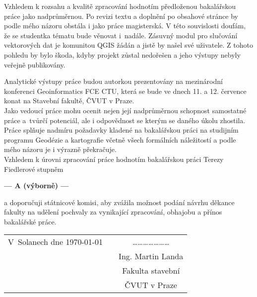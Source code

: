 \documentclass[czech,11pt,a4paper]{article}
\begin{document}
Vzhledem k rozsahu a kvalitě zpracování hodnotím předloženou
bakalářskou práce jako nadprůměrnou. Po revizi textu a doplnění po
obsahové stránce by podle mého názoru obstála i jako práce
magisterská. V této souvislosti doufám, že se studentka tématu bude
věnovat i~nadále. Zásuvný modul pro slučování vektorových dat je
komunitou QGIS žádán a jistě by našel své uživatele. Z tohoto pohledu
by bylo škoda, kdyby projekt zůstal nedořešen a jeho výstupy nebyly
veřejně publikovány.

Analytické výstupy práce budou autorkou prezentovány na mezinárodní
konferenci Geoinformatics FCE CTU, která se bude ve dnech 11. a
12. července konat na Stavební fakultě, ČVUT v Praze.
\\

Jako vedoucí práce mohu ocenit nejen její nadprůměrnou schopnost
samostatné práce a~tvůrčí potenciál, ale i odpovědnost se kterým se
daného úkolu zhostila. Práce splňuje nadmíru požadavky kladené na
bakalářskou práci na studijním programu Geodézie a kartografie včetně
všech formálních náležitostí a podle mého názoru je i výrazně překračuje. \\

Vzhledem k úrovni zpracování práce hodnotím bakalářskou práci Terezy
Fiedlerové stupněm

\begin{center}
{\bf --- A (výborně)  ---}
\end{center}

a doporučuji státnicové komisi, aby zvážila možnost podání návrhu
děkance fakulty na udělení pochvaly za vynikající zpracování, obhajobu
a přínos bakalářské práce.

\vspace{2cm}

\begin{tabular}{lp{}c}
V~Solanech dne \today & & \ldots\ldots\ldots\ldots\ldots\ldots\ldots \\
& & Ing. Martin Landa \\
& & Fakulta stavební \\
& & ČVUT v Praze \\
\end{tabular}
\end{document}
